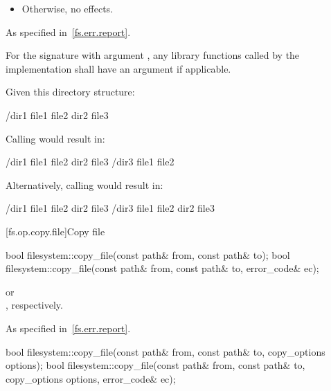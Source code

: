 \begin{itemdescr}
\begin{itemize}
\item
Otherwise, no effects.
\end{itemize}

\pnum
\throws
As specified in~\ref{fs.err.report}.

\pnum
\remarks
For the signature with argument , any
library functions called by the implementation shall have an  argument if applicable.

\pnum
\begin{example}
Given this directory structure:
\begin{outputblock}
/dir1
  file1
  file2
  dir2
    file3
\end{outputblock}

Calling  would result in:
\begin{outputblock}
/dir1
  file1
  file2
  dir2
    file3
/dir3
  file1
  file2
\end{outputblock}

Alternatively, calling  would result in:
\begin{outputblock}
/dir1
  file1
  file2
  dir2
    file3
/dir3
  file1
  file2
  dir2
    file3
\end{outputblock}
\end{example}
\end{itemdescr}


[fs.op.copy.file]{Copy file}

%
\begin{itemdecl}
bool filesystem::copy_file(const path& from, const path& to);
bool filesystem::copy_file(const path& from, const path& to, error_code& ec);
\end{itemdecl}

\begin{itemdescr}
\pnum
\returns
{} or\\
, respectively.

\pnum
\throws
As specified in~\ref{fs.err.report}.
\end{itemdescr}

%
\begin{itemdecl}
bool filesystem::copy_file(const path& from, const path& to, copy_options options);
bool filesystem::copy_file(const path& from, const path& to, copy_options options,
                           error_code& ec);
\end{itemdecl}

